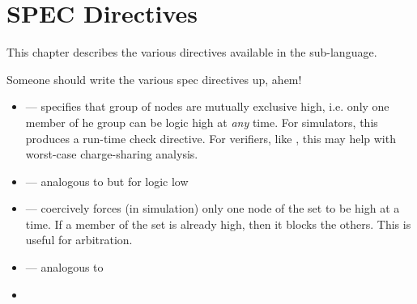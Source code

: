 
\chapter{SPEC Directives}
\label{sec:spec}

This chapter describes the various directives available
in the  sub-language.  

Someone should write the various spec directives up, ahem!

\begin{itemize}
\item {} --- specifies that group of nodes are 
	mutually exclusive high, i.e. only one member of he group can be
	logic high at \emph{any} time.  For simulators, this produces
	a run-time check directive.  For verifiers, like , 
	this may help with worst-case charge-sharing analysis.  
\item {} --- analogous to  but for logic low
\item {} --- coercively forces (in simulation) only
	one node of the set to be high at a time.  If a member of the
	set is already high, then it blocks the others.  
	This is useful for arbitration.  
\item {} --- analogous to 
\item {}
\end{itemize}

